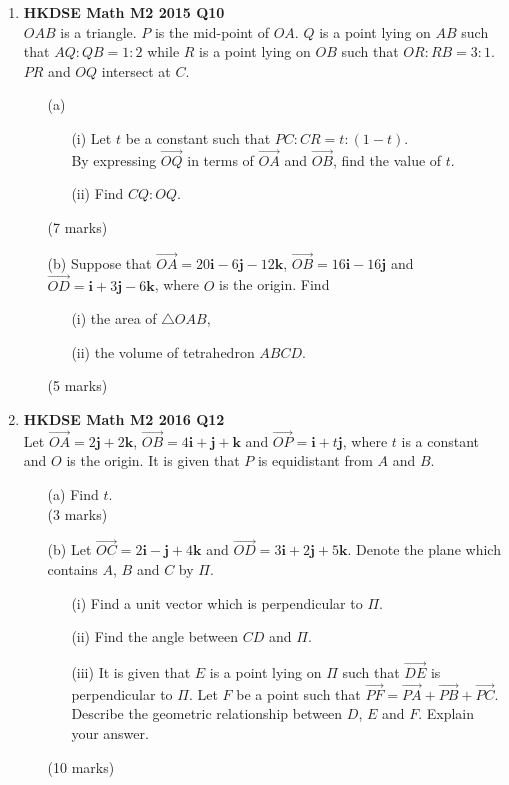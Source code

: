 \documentclass[12pt]{article}
\begin{document}
\begin{enumerate}
	\item \textbf{HKDSE Math M2 2015 Q10}\\
	$OAB$ is a triangle. $P$ is the mid-point of $OA$. $Q$ is a point lying on $AB$ such that $AQ : QB = 1 : 2$ while $R$ is a point lying on $OB$ such that $OR : RB = 3:1$. $PR$ and $OQ$ intersect at $C$. 
	\begin{enumerate}
		\item [(a)]		
		\begin{enumerate}
			\item [(i)]Let $t$ be a constant such that $PC : CR = t : (1-t)$.\\
				By expressing $\overrightarrow{OQ}$ in terms of $\overrightarrow{OA}$ and $\overrightarrow{OB}$, find the value of $t$. 
			\item [(ii)]Find $CQ:OQ$. 
		\end{enumerate}
		(7 marks)
		\item [(b)]Suppose that $\overrightarrow{OA} = 20\textbf{i} -6 \textbf{j} -12\textbf {k}$, $\overrightarrow{OB} = 16\textbf{i} -16 \textbf{j}$ and $\overrightarrow{OD} = \textbf{i} +3 \textbf{j} -6\textbf {k}$, where $O$ is the origin. Find
		\begin{enumerate}
			\item [(i)]the area of $\triangle OAB$, 
			\item [(ii)]the volume of tetrahedron $ABCD$.
		\end{enumerate}
		(5 marks)
	\end{enumerate}
	
	\newpage

	\item \textbf{HKDSE Math M2 2016 Q12}\\
	Let $\overrightarrow{OA} = 2 \textbf{j} +2\textbf {k}$, 
		$\overrightarrow{OB} = 4\textbf{i} + \textbf{j} + \textbf {k}$ and 
		$\overrightarrow{OP} = \textbf{i} +t \textbf{j}$, where $t$ is a constant and $O$ is the origin. It is given that $P$ is equidistant from $A$ and $B$. 
	\begin{enumerate}
		\item [(a)]Find $t$.\\(3 marks)
		\item [(b)]Let $\overrightarrow{OC} = 2 \textbf{i} - \textbf{j} +4\textbf {k}$ and $\overrightarrow{OD} = 3 \textbf{i} +2 \textbf{j} +5\textbf {k}$. Denote the plane which contains $A$, $B$ and $C$ by $\Pi$.
		\begin{enumerate}
			\item [(i)]Find a unit vector which is perpendicular to $\Pi$. 
			\item [(ii)]Find the angle between $CD$ and  $\Pi$. 
			\item [(iii)]It is given that $E$ is a point lying on $\Pi$ such that 
			$\overrightarrow{DE}$ is perpendicular to $\Pi$. Let $F$ be a point such that $\overrightarrow{PF} = \overrightarrow{PA} + \overrightarrow{PB} + \overrightarrow{PC}$. Describe the geometric relationship between $D$, $E$ and $F$. Explain your answer.
		\end{enumerate}
		(10 marks)
	\end{enumerate}


\end{enumerate}
\end{document}
